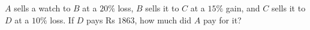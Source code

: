 $A$ sells a watch to $B$ at a $20\%$ loss, $B$ sells it to $C$ at a $15\%$ gain, and $C$ sells it to $D$ at a $10\%$ loss. If $D$ pays Rs $1863$, how much did $A$ pay for it?
